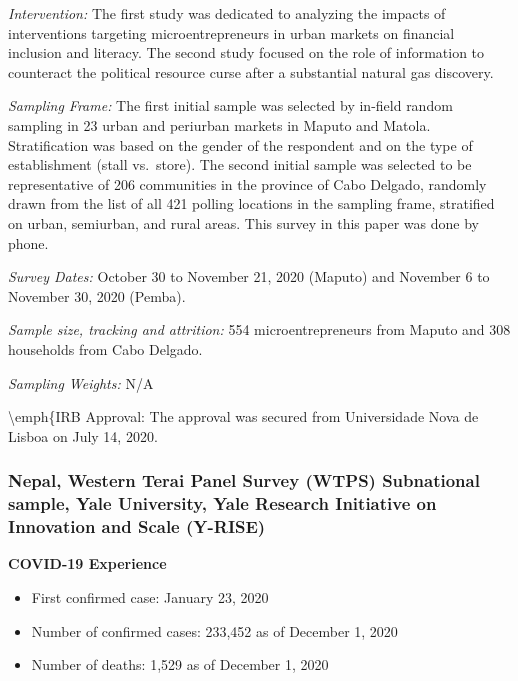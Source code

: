 \documentclass[
  12pt,
]{article}
\begin{document}
\emph{Intervention:} The first study was dedicated to analyzing the impacts of interventions targeting microentrepreneurs in urban markets on financial inclusion and literacy. The second study focused on the role of information to counteract the political resource curse after a substantial natural gas discovery.

\emph{Sampling Frame:} The first initial sample was selected by in-field random sampling in 23 urban and periurban markets in Maputo and Matola. Stratification was based on the gender of the respondent and on the type of establishment (stall vs.~store). The second initial sample was selected to be representative of 206 communities in the province of Cabo Delgado, randomly drawn from the list of all 421 polling locations in the sampling frame, stratified on urban, semiurban, and rural areas. This survey in this paper was done by phone.

\emph{Survey Dates:} October 30 to November 21, 2020 (Maputo) and November 6 to November 30, 2020 (Pemba).

\emph{Sample size, tracking and attrition:} 554 microentrepreneurs from Maputo and 308 households from Cabo Delgado.

\emph{Sampling Weights:} N/A

\textbackslash emph\{IRB Approval: The approval was secured from Universidade Nova de Lisboa on July 14, 2020.

\hypertarget{nepal-western-terai-panel-survey-wtps-subnational-sample-yale-university-yale-research-initiative-on-innovation-and-scale-y-rise}{%
\subsubsection*{Nepal, Western Terai Panel Survey (WTPS) Subnational sample, Yale University, Yale Research Initiative on Innovation and Scale (Y-RISE)}\label{nepal-western-terai-panel-survey-wtps-subnational-sample-yale-university-yale-research-initiative-on-innovation-and-scale-y-rise}}

\textbf{COVID-19 Experience}

\begin{itemize}
\item First confirmed case: January 23, 2020


\item Number of confirmed cases:  233,452 as of December 1, 2020 
\item Number of deaths:   1,529 as of December 1, 2020
\end{itemize}
\end{document}
